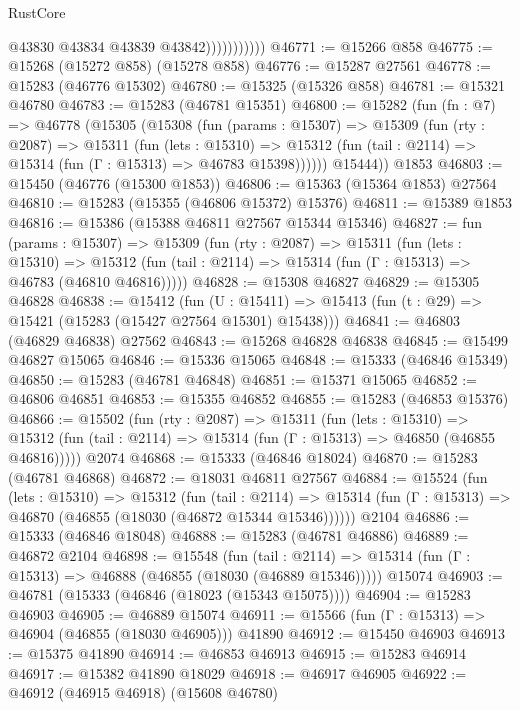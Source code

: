 \begin{lexlean}{RustCore}
\begin{coremodule}
                          @43830
                          @43834
                          @43839
                          @43842)))))))))))
@46771 := @15266 @858
@46775 := @15268 (@15272 @858) (@15278 @858)
@46776 := @15287 @27561
@46778 := @15283 (@46776 @15302)
@46780 := @15325 (@15326 @858)
@46781 := @15321 @46780
@46783 := @15283 (@46781 @15351)
@46800 := @15282
    (fun (fn : @7) =>
    @46778
      (@15305
        (@15308
          (fun (params : @15307) =>
          @15309
            (fun (rty : @2087) =>
            @15311
              (fun (lets : @15310) =>
              @15312 (fun (tail : @2114) => @15314 (fun (Γ : @15313) => @46783 @15398))))))
        @15444))
    @1853
@46803 := @15450 (@46776 (@15300 @1853))
@46806 := @15363 (@15364 @1853) @27564
@46810 := @15283 (@15355 (@46806 @15372) @15376)
@46811 := @15389 @1853
@46816 := @15386 (@15388 @46811 @27567 @15344 @15346)
@46827 := fun (params : @15307) =>
  @15309
    (fun (rty : @2087) =>
    @15311
      (fun (lets : @15310) =>
      @15312 (fun (tail : @2114) => @15314 (fun (Γ : @15313) => @46783 (@46810 @46816)))))
@46828 := @15308 @46827
@46829 := @15305 @46828
@46838 := @15412
    (fun (U : @15411) => @15413 (fun (t : @29) => @15421 (@15283 (@15427 @27564 @15301) @15438)))
@46841 := @46803 (@46829 @46838) @27562
@46843 := @15268 @46828 @46838
@46845 := @15499 @46827 @15065
@46846 := @15336 @15065
@46848 := @15333 (@46846 @15349)
@46850 := @15283 (@46781 @46848)
@46851 := @15371 @15065
@46852 := @46806 @46851
@46853 := @15355 @46852
@46855 := @15283 (@46853 @15376)
@46866 := @15502
    (fun (rty : @2087) =>
    @15311
      (fun (lets : @15310) =>
      @15312 (fun (tail : @2114) => @15314 (fun (Γ : @15313) => @46850 (@46855 @46816)))))
    @2074
@46868 := @15333 (@46846 @18024)
@46870 := @15283 (@46781 @46868)
@46872 := @18031 @46811 @27567
@46884 := @15524
    (fun (lets : @15310) =>
    @15312
      (fun (tail : @2114) =>
      @15314 (fun (Γ : @15313) => @46870 (@46855 (@18030 (@46872 @15344 @15346))))))
    @2104
@46886 := @15333 (@46846 @18048)
@46888 := @15283 (@46781 @46886)
@46889 := @46872 @2104
@46898 := @15548
    (fun (tail : @2114) => @15314 (fun (Γ : @15313) => @46888 (@46855 (@18030 (@46889 @15346)))))
    @15074
@46903 := @46781 (@15333 (@46846 (@18023 (@15343 @15075))))
@46904 := @15283 @46903
@46905 := @46889 @15074
@46911 := @15566 (fun (Γ : @15313) => @46904 (@46855 (@18030 @46905))) @41890
@46912 := @15450 @46903
@46913 := @15375 @41890
@46914 := @46853 @46913
@46915 := @15283 @46914
@46917 := @15382 @41890 @18029
@46918 := @46917 @46905
@46922 := @46912 (@46915 @46918) (@15608 @46780)

\end{coremodule}
\end{lexlean}
